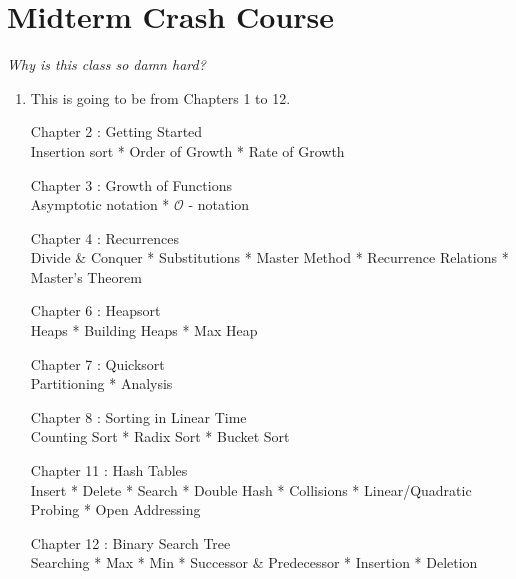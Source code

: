 \documentclass[10pt,letterpaper]{article}
\begin{document}
{
\section*{Midterm Crash Course}
\emph{Why is this class so damn hard?}
\begin{enumerate}
	\item[]This is going to be from Chapters 1 to 12.
	\begin{center}
    Chapter 2    : Getting Started \\
    Insertion sort * Order of Growth * Rate of Growth
    
    Chapter 3   : Growth of Functions\\
    Asymptotic notation * $\mathcal{O}$ - notation 
    
    Chapter 4   : Recurrences\\
    Divide \& Conquer * Substitutions * Master Method * Recurrence Relations * Master's Theorem
    
    Chapter 6   : Heapsort\\
    Heaps * Building Heaps * Max Heap 
    
    Chapter 7   : Quicksort\\
    Partitioning * Analysis 
    
    Chapter 8   : Sorting in Linear Time\\
    Counting Sort * Radix Sort * Bucket Sort
    
    Chapter 11  : Hash Tables\\
    Insert * Delete * Search * Double Hash * Collisions * Linear/Quadratic Probing * Open Addressing
    
    Chapter 12  :   Binary Search Tree\\
    Searching * Max * Min * Successor \& Predecessor * Insertion * Deletion
    
	\end{center}

\end{enumerate}
} %
\end{document}
